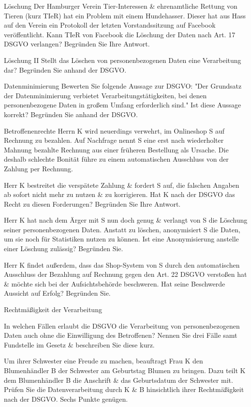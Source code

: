 \documentclass{exercisesheet}
\begin{document}
\begin{exercise}{Löschung}
  Der Hamburger Verein Tier-Interessen \& ehrenamtliche Rettung von Tieren (kurz TIeR) hat ein Problem mit einem Hundehasser. Dieser hat aus Hass auf den Verein ein Protokoll der letzten Vorstandssitzung auf Facebook veröffentlicht. Kann TIeR von Facebook die Löschung der Daten nach Art. 17 DSGVO verlangen? Begründen Sie Ihre Antwort.
\end{exercise}

\begin{exercise}{Löschung II}
  Stellt das Löschen von personenbezogenen Daten eine Verarbeitung dar? Begründen Sie anhand der DSGVO.
\end{exercise}

\begin{exercise}{Datenminimierung}
  Bewerten Sie folgende Aussage zur DSGVO: "Der Grundsatz der Datenminimierung verbietet Verarbeitungstätigkeiten, bei denen personenbezogene Daten in großem Umfang erforderlich sind." Ist diese Aussage korrekt? Begründen Sie anhand der DSGVO.
\end{exercise}

\begin{eexercises}{Betroffenenrechte}{
    Herrn K wird neuerdings verwehrt, im Onlineshop S auf Rechnung zu bezahlen. Auf Nachfrage nennt S eine erst nach wiederholter Mahnung bezahlte Rechnung aus einer früheren Bestellung als Ursache. Die deshalb schlechte Bonität führe zu einem automatischen Ausschluss von der Zahlung per Rechnung.
  }
  \item Herr K bestreitet die verspätete Zahlung \& fordert S auf, die falschen Angaben ab sofort nicht mehr zu nutzen \& zu korrigieren. Hat K nach der DSGVO das Recht zu diesen Forderungen? Begründen Sie Ihre Antwort.
  \item Herr K hat nach dem Ärger mit S nun doch genug \& verlangt von S die Löschung seiner personenbezogenen Daten. Anstatt zu löschen, anonymisiert S die Daten, um sie noch für Statistiken nutzen zu können. Ist eine Anonymisierung anstelle einer Löschung zulässig? Begründen Sie.
  \item Herr K findet außerdem, dass das Shop-System von S durch den automatischen Ausschluss der Bezahlung auf Rechnung gegen den Art. 22 DSGVO verstoßen hat \& möchte sich bei der Aufsichtsbehörde beschweren. Hat seine Beschwerde Aussicht auf Erfolg? Begründen Sie.
\end{eexercises}

\begin{exercises}{Rechtmäßigkeit der Verarbeitung}
\item In welchen Fällen erlaubt die DSGVO die Verarbeitung von personenbezogenen Daten auch ohne die Einwilligung des Betroffenen? Nennen Sie drei Fälle samt Fundstelle im Gesetz \& beschreiben Sie diese kurz.
\item Um ihrer Schwester eine Freude zu machen, beauftragt Frau K den Blumenhändler B der Schwester am Geburtstag Blumen zu bringen. Dazu teilt K dem Blumenhändler B die Anschrift \& das Geburtsdatum der Schwester mit. Prüfen Sie die Datenverarbeitung durch K \& B hinsichtlich ihrer Rechtmäßigkeit nach der DSGVO. Sechs Punkte genügen.
\end{exercises}
\end{document}
